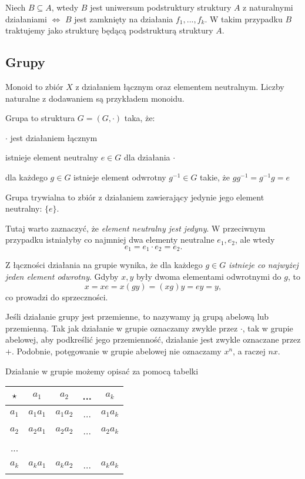 Niech $B\subseteq A$, wtedy $B$ jest uniwersum podstruktury struktury $A$ z naturalnymi działaniami $\iff$ $B$ jest zamknięty na działania $f_1,...,f_k$. W takim przypadku $B$ traktujemy jako strukturę będącą podstrukturą struktury $A$.
\medskip

\subsection{Grupy}

{\color{def}Monoid} to zbiór $X$ z działaniem łącznym oraz elementem neutralnym. Liczby naturalne z dodawaniem są przykładem monoidu.
\medskip

\pdef

{\color{def}Grupa} to struktura $G=(G, \cdot)$ taka, że:

\point $\cdot$ jest działaniem łącznym

\point istnieje element neutralny $e\in G$ dla działania $\cdot$

\point dla każdego $g\in G$ istnieje element odwrotny $g^{-1}\in G$ takie, że $gg^{-1}=g^{-1}g=e$
\smallskip

\kdef
Grupa trywialna to zbiór z działaniem zawierający jedynie jego element neutralny: $\{e\}$.
\medskip

Tutaj warto zaznaczyć, że \emph{element neutralny jest jedyny}. W przeciwnym przypadku istniałyby co najmniej dwa elementy neutralne $e_1,e_2$, ale wtedy
$$e_1=e_1\cdot e_2=e_2.$$

Z łączności działania na grupie wynika, że dla każdego $g\in G$ \emph{istnieje co najwyżej jeden element odwrotny}. Gdyby $x,y$ były dwoma elementami odwrotnymi do $g$, to
$$x=xe=x(gy)=(xg)y=ey=y,$$
co prowadzi do sprzeczności.
\medskip

Jeśli działanie grupy jest przemienne, to nazywamy ją {\color{def}grupą abelową} lub przemienną. Tak jak działanie w grupie oznaczamy zwykle przez $\cdot$, tak w grupie abelowej, aby podkreślić jego przemienność, działanie jest zwykle oznaczane przez $+$. Podobnie, potęgowanie w grupie abelowej nie oznaczamy $x^n$, a raczej $nx$.
\bigskip

\bigskip

Działanie w grupie możemy opisać za pomocą {\color{acc}tabelki}
\begin{center}
    \begin{tabular}{c | c | c | c | c }
        $\star$ & $a_1$ & $a_2$ &...& $a_k$\\

        \hline

        $a_1$ & $a_1a_1$ & $a_1a_2$ & ... & $a_1a_k$\\

        $a_2$ & $a_2a_1$ & $a_2a_2$ & ... & $a_2a_k$\\

        ... & \\

        $a_k$ & $a_ka_1$ & $a_ka_2$ & ... & $a_ka_k$
    \end{tabular}
\end{center}
\smallskip

